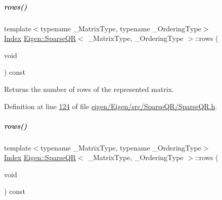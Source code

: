 \mbox{\label{group___sparse_q_r___module_ab9133b7ace1c19714df99f553666316d}} 
\subparagraph{\texorpdfstring{rows()}{rows()}\hspace{0.1cm}{\footnotesize\ttfamily [1/2]}}
{\footnotesize\ttfamily template$<$typename \+\_\+\+Matrix\+Type, typename \+\_\+\+Ordering\+Type$>$ \\
\hyperlink{namespace_eigen_a62e77e0933482dafde8fe197d9a2cfde}{Index} \hyperlink{group___sparse_q_r___module_class_eigen_1_1_sparse_q_r}{Eigen\+::\+Sparse\+QR}$<$ \+\_\+\+Matrix\+Type, \+\_\+\+Ordering\+Type $>$\+::rows (\begin{DoxyParamCaption}\item[{void}]{ }\end{DoxyParamCaption}) const\hspace{0.3cm}{\ttfamily [inline]}}

\begin{DoxyReturn}{Returns}
the number of rows of the represented matrix. 
\end{DoxyReturn}


Definition at line \hyperlink{eigen_2_eigen_2src_2_sparse_q_r_2_sparse_q_r_8h_source_l00124}{124} of file \hyperlink{eigen_2_eigen_2src_2_sparse_q_r_2_sparse_q_r_8h_source}{eigen/\+Eigen/src/\+Sparse\+Q\+R/\+Sparse\+Q\+R.\+h}.

\mbox{\label{group___sparse_q_r___module_ab9133b7ace1c19714df99f553666316d}} 
\subparagraph{\texorpdfstring{rows()}{rows()}\hspace{0.1cm}{\footnotesize\ttfamily [2/2]}}
{\footnotesize\ttfamily template$<$typename \+\_\+\+Matrix\+Type, typename \+\_\+\+Ordering\+Type$>$ \\
\hyperlink{namespace_eigen_a62e77e0933482dafde8fe197d9a2cfde}{Index} \hyperlink{group___sparse_q_r___module_class_eigen_1_1_sparse_q_r}{Eigen\+::\+Sparse\+QR}$<$ \+\_\+\+Matrix\+Type, \+\_\+\+Ordering\+Type $>$\+::rows (\begin{DoxyParamCaption}\item[{void}]{ }\end{DoxyParamCaption}) const\hspace{0.3cm}{\ttfamily [inline]}}

